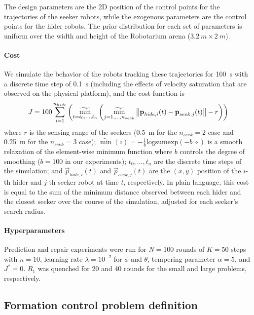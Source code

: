 The design parameters are the 2D position of the control points for the trajectories of the seeker robots, while the exogenous parameters are the control points for the hider robots. The prior distribution for each set of parameters is uniform over the width and height of the Robotarium arena ($\SI{3.2}{m}\times\SI{2}{m}$).

\paragraph{Cost} We simulate the behavior of the robots tracking these trajectories for \SI{100}{s} with a discrete time step of \SI{0.1}{s} (including the effects of velocity saturation that are observed on the physical platform), and the cost function is
\begin{align*}
    J = 100 \sum_{i=1}^{n_{hide}}\left( \mathop{\widetilde{\min}}_{t = t_0, \ldots, t_{n}} \left( \mathop{\widetilde{\min}}_{j=1, \ldots, n_{seek}}\left\lVert\boldsymbol{\mathbf{p}}_{hide, i}(t) - \boldsymbol{\mathbf{p}}_{seek, j}(t)\right\rVert - r \right) \right)
\end{align*}
%
where $r$ is the sensing range of the seekers (\SI{0.5}{m} for the $n_{seek} = 2$ case and \SI{0.25}{m} for the $n_{seek}=3$ case); $\widetilde{\min}(\circ) = -\frac{1}{b}\text{logsumexp}(-b\ \circ)$ is a smooth relaxation of the element-wise minimum function where $b$ controls the degree of smoothing ($b=100$ in our experiments); $t_0, \ldots, t_{n}$ are the discrete time steps of the simulation; and $\vec{p}_{hide, i}(t)$ and $\vec{p}_{seek, j}(t)$ are the $(x, y)$ position of the $i$-th hider and $j$-th seeker robot at time $t$, respectively. In plain language, this cost is equal to the sum of the minimum distance observed between each hider and the closest seeker over the course of the simulation, adjusted for each seeker's search radius.

\paragraph{Hyperparameters} Prediction and repair experiments were run for $N=100$ rounds of $K=50$ steps with $n=10$, learning rate $\lambda = 10^{-2}$ for $\phi$ and $\theta$, tempering parameter $\alpha = 5$, and $J^* = 0$.  $R_1$ was quenched for 20 and 40 rounds for the small and large problems, respectively.

\subsection{Formation control problem definition}


